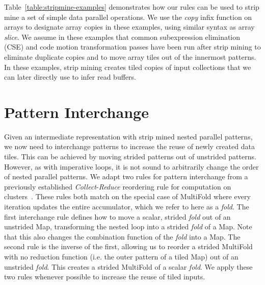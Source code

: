 

Table~\ref{table:stripmine-examples} demonstrates how our rules can be used to strip mine a set of simple data parallel operations.
We use the \emph{copy} infix function on arrays to designate array copies in these examples, using similar syntax as array \emph{slice}.
We assume in these examples that common subexpression elimination (CSE) and code motion transformation passes have been run after strip mining to eliminate duplicate copies and to
move array tiles out of the innermost patterns. In these examples, strip mining creates tiled copies of input collections that
we can later directly use to infer read buffers.

\section{Pattern Interchange}



Given an intermediate representation with strip mined nested parallel patterns, we now need to interchange patterns to increase the reuse
of newly created data tiles. This can be achieved by moving strided patterns out of unstrided patterns. However, as with imperative loops,
it is not sound to arbitrarily change the order of nested parallel patterns.
We adapt two rules for pattern interchange from a previously established \emph{Collect}-\emph{Reduce} reordering rule for computation on clusters~\cite{brown16clusters}.
These rules both match on the special case of MultiFold where every iteration updates the entire accumulator, which we refer to here as a \emph{fold}.
The first interchange rule defines how to move a scalar, strided \emph{fold} out of an unstrided Map, transforming the nested loop into a strided \emph{fold} of a Map.
Note that this also changes the combination function of the \emph{fold} into a Map.
The second rule is the inverse of the first, allowing us to reorder a strided MultiFold with no reduction function (i.e. the outer pattern of a tiled Map)
out of an unstrided \emph{fold}. This creates a strided MultiFold of a scalar \emph{fold}. We apply these two rules whenever possible to increase the reuse
of tiled inputs.

